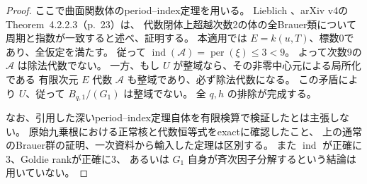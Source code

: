 \begin{proof}
ここで曲面関数体のperiod--index定理を用いる。
Lieblich \cite{LieblichPeriodIndex}、arXiv v4のTheorem~4.2.2.3（p.~23）は、
代数閉体上超越次数2の体の全Brauer類について周期と指数が一致すると述べ、証明する。
本適用では $E=k(u,T)$、標数0であり、全仮定を満たす。
従って $\operatorname{ind}(\mathcal A)=\operatorname{per}(\xi)\le3<9$。
よって次数9の $\mathcal A$ は除法代数でない。
一方、もし $U$ が整域なら、その非零中心元による局所化である
有限次元 $E$ 代数 $\mathcal A$ も整域であり、必ず除法代数になる。
この矛盾により $U$、従って $B_{q,1}/(G_1)$ は整域でない。
全 $q,h$ の排除が完成する。

なお、引用した深いperiod--index定理自体を有限検算で検証したとは主張しない。
原始九乗根における正常核と代数恒等式をexactに確認したこと、
上の通常のBrauer群の証明、一次資料から輸入した定理は区別する。
また $\operatorname{ind}$ が正確に3、Goldie rankが正確に3、
あるいは $G_1$ 自身が斉次因子分解するという結論は用いていない。
\end{proof}
